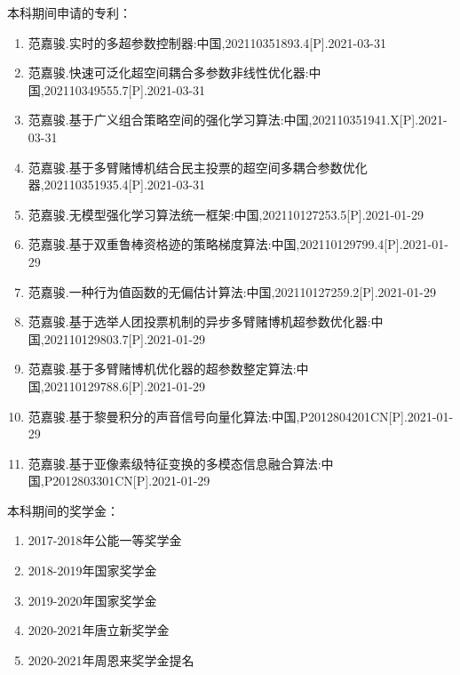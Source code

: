 本科期间申请的专利：
\begin{enumerate}
\item 范嘉骏.实时的多超参数控制器:中国,202110351893.4[P].2021-03-31
\item 范嘉骏.快速可泛化超空间耦合多参数非线性优化器:中国,202110349555.7[P].2021-03-31
\item 范嘉骏.基于广义组合策略空间的强化学习算法:中国,202110351941.X[P].2021-03-31
\item 范嘉骏.基于多臂赌博机结合民主投票的超空间多耦合参数优化器,202110351935.4[P].2021-03-31
\item 范嘉骏.无模型强化学习算法统一框架:中国,202110127253.5[P].2021-01-29
\item 范嘉骏.基于双重鲁棒资格迹的策略梯度算法:中国,202110129799.4[P].2021-01-29
\item 范嘉骏.一种行为值函数的无偏估计算法:中国,202110127259.2[P].2021-01-29 
\item 范嘉骏.基于选举人团投票机制的异步多臂赌博机超参数优化器:中国,202110129803.7[P].2021-01-29
\item 范嘉骏.基于多臂赌博机优化器的超参数整定算法:中国,202110129788.6[P].2021-01-29
\item 范嘉骏.基于黎曼积分的声音信号向量化算法:中国,P2012804201CN[P].2021-01-29
\item 范嘉骏.基于亚像素级特征变换的多模态信息融合算法:中国,P2012803301CN[P].2021-01-29
\end{enumerate}

本科期间的奖学金：
\begin{enumerate}
\item 2017-2018年公能一等奖学金
\item 2018-2019年国家奖学金
\item 2019-2020年国家奖学金
\item 2020-2021年唐立新奖学金
\item 2020-2021年周恩来奖学金提名
\end{enumerate}